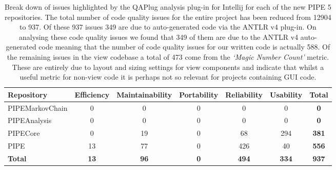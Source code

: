 \begin{table}[tb]
\small
\begin{center}
  \begin{tabular}{| l | c | c | c | c | c | c |}
    \hline
    Repository & Efficiency & Maintainability & Portability & Reliability & Usability & \textbf{Total} \\ 
    \hline
    PIPEMarkovChain & 0 & 0 & 0 & 0 & 0 & \textbf{0}\\ 
    \hline
    PIPEAnalysis & 0 & 0 & 0 & 0 & 0 & \textbf{0}\\    
    \hline
    PIPECore & 0 & 19 & 0 & 68 & 294 & \textbf{381}\\
    \hline
    PIPE & 13 & 77 & 0 & 426 & 40 & \textbf{556}\\
    \hline
    \textbf{Total} & \textbf{13} & \textbf{96} & \textbf{0} & \textbf{494} & \textbf{334} & {\color{red}\textbf{937}}\\
    \hline

  \end{tabular}
\caption{Break down of issues highlighted by the QAPlug analysis plug-in for Intellij for
each of the new PIPE 5 repositories. The total number of code quality issues for the entire project has been reduced from \num{12904} to \num{937}. Of these \num{937} issues \num{349} are due to auto-generated code via the ANTLR v4 plug-in.
On analysing these code quality issues we found that \num{349} of them are due to the ANTLR v4 auto-generated code meaning that the number of code quality issues for our written code is actually \num{588}. 
Of the remaining issues in the view codebase a total of \num{473} come from the \textit{`Magic Number Count'} metric. These are entirely due to layout and sizing settings for view components and indicate that whilst a useful metric for non-view code it is perhaps not so relevant for projects containing GUI code.
}
\label{tbl:pipe5_qaplug}
\end{center}
\end{table}
